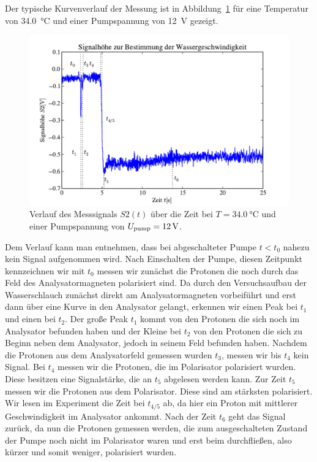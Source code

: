 \documentclass[paper=a4,
	fontsize=10pt,
	DIV=18,
	twocolumn,
	parskip=half
	]{scrartcl}
\numberwithin{equation}{section}    %
\begin{document}
Der typische Kurvenverlauf der Messung ist in Abbildung~\ref{fig.wassergeschwindigkeit} für eine Temperatur von \SI{34.0}{\celsius} und einer Pumpspannung von \SI{12}{\volt} gezeigt.

\begin{figure}[htp]
	\begin{center}
		\includegraphics[width=\columnwidth]{Data-Plots/06-wassergeschwindigkeit.pdf}
		\caption{Verlauf des Messsignals $S2(t)$ über die Zeit bei $T=\SI{34.0}{\celsius}$ und einer Pumpspannung von $U_{\rm pump}=\SI{12}{\volt}$.}
		\label{fig.wassergeschwindigkeit}
	\end{center}
\end{figure}

Dem Verlauf kann man entnehmen, dass bei abgeschalteter Pumpe $t<t_0$ nahezu kein Signal aufgenommen wird. Nach Einschalten der Pumpe, diesen Zeitpunkt kennzeichnen wir mit $t_0$ messen wir zunächst die Protonen die noch durch das Feld des Analysatormagneten polarisiert sind. Da durch den Versuchsaufbau der Wasserschlauch zunächst direkt am Analysatormagneten vorbeiführt und erst dann über eine Kurve in den Analysator gelangt, erkennen wir einen Peak bei $t_1$ und einen bei $t_2$. Der große Peak $t_1$ kommt von den Protonen die sich noch im Analysator befunden haben und der Kleine bei $t_2$ von den Protonen die sich zu Beginn neben dem Analysator, jedoch in seinem Feld befunden haben. Nachdem die Protonen aus dem Analysatorfeld gemessen wurden $t_3$, messen wir bis $t_4$ kein Signal. Bei $t_4$ messen wir die Protonen, die im Polarisator polarisiert wurden. Diese besitzen eine Signalstärke, die an $t_5$ abgelesen werden kann. Zur Zeit $t_5$ messen wir die Protonen aus dem Polarisator. Diese sind am stärksten polarisiert. Wir lesen im Experiment die Zeit bei $t_{4/5}$ ab, da hier ein Proton mit mittlerer Geschwindigkeit im Analysator ankommt. Nach der Zeit $t_6$ geht das Signal zurück, da nun die Protonen gemessen werden, die zum ausgeschalteten Zustand der Pumpe noch nicht im Polarisator waren und erst beim durchfließen, also kürzer und somit weniger, polarisiert wurden.
\end{document}
